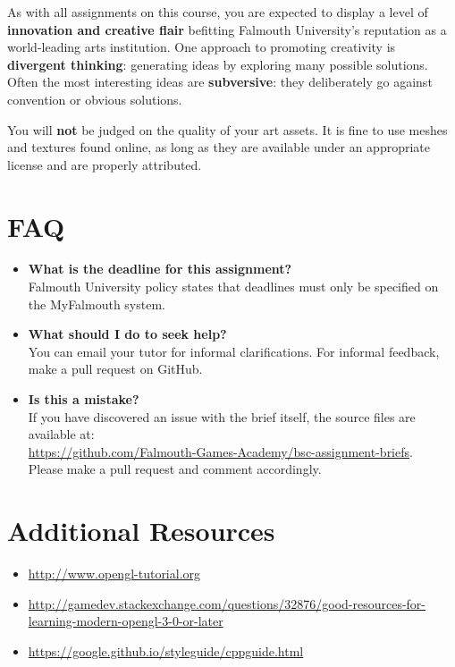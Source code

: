 \documentclass{../fal_assignment}
\begin{document}
As with all assignments on this course, you are expected to display a level of
\textbf{innovation and creative flair} befitting Falmouth University's reputation as a world-leading
arts institution.
One approach to promoting creativity is
\textbf{divergent thinking}: generating ideas by exploring many possible solutions.
Often the most interesting ideas are \textbf{subversive}: they deliberately go against
convention or obvious solutions.

You will \textbf{not} be judged on the quality of your art assets.
It is fine to use meshes and textures found online,
as long as they are available under an appropriate license and are properly attributed.

\section*{FAQ}

\begin{itemize}
	\item 	\textbf{What is the deadline for this assignment?} \\ 
    		Falmouth University policy states that deadlines must only be specified on the MyFalmouth system.
    		
	\item 	\textbf{What should I do to seek help?} \\ 
    		You can email your tutor for informal clarifications. For informal feedback, make a pull request on GitHub. 
    		
    	\item 	\textbf{Is this a mistake?} \\ 	
    		If you have discovered an issue with the brief itself, the source files are available at: \\
    		\url{https://github.com/Falmouth-Games-Academy/bsc-assignment-briefs}.\\
    		 Please make a pull request and comment accordingly.
\end{itemize}

\section*{Additional Resources}

\begin{itemize}
    \item \url{http://www.opengl-tutorial.org}
    \item \url{http://gamedev.stackexchange.com/questions/32876/good-resources-for-learning-modern-opengl-3-0-or-later}
    \item \url{https://google.github.io/styleguide/cppguide.html}
\end{itemize}
\end{document}
